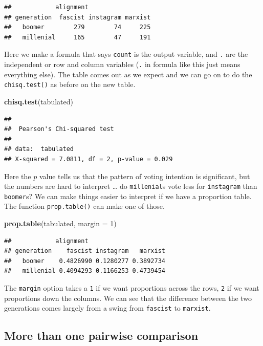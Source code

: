 \documentclass[
]{book}
\newenvironment{Shaded}{\begin{snugshade}}{\end{snugshade}}
\newcommand{\DataTypeTok}[1]{\textcolor[rgb]{0.13,0.29,0.53}{#1}}
\newcommand{\DecValTok}[1]{\textcolor[rgb]{0.00,0.00,0.81}{#1}}
\newcommand{\KeywordTok}[1]{\textcolor[rgb]{0.13,0.29,0.53}{\textbf{#1}}}
\newcommand{\NormalTok}[1]{#1}
\begin{document}
\begin{verbatim}
##            alignment
## generation  fascist instagram marxist
##   boomer        279        74     225
##   millenial     165        47     191
\end{verbatim}

Here we make a formula that says \texttt{count} is the output variable, and \texttt{.} are the independent or row and column variables (\texttt{.} in formula like this just means everything else). The table comes out as we expect and we can go on to do the \texttt{chisq.test()} as before on the new table.

\begin{Shaded}
\begin{Highlighting}[]
\KeywordTok{chisq.test}\NormalTok{(tabulated)}
\end{Highlighting}
\end{Shaded}

\begin{verbatim}
## 
## 	Pearson's Chi-squared test
## 
## data:  tabulated
## X-squared = 7.0811, df = 2, p-value = 0.029
\end{verbatim}

Here the \(p\) value tells us that the pattern of voting intention is significant, but the numbers are hard to interpret \ldots{} do \texttt{millenial}s vote less for \texttt{instagram} than \texttt{boomer}s? We can make things easier to interpret if we have a proportion table. The function \texttt{prop.table()} can make one of those.

\begin{Shaded}
\begin{Highlighting}[]
\KeywordTok{prop.table}\NormalTok{(tabulated, }\DataTypeTok{margin =} \DecValTok{1}\NormalTok{)}
\end{Highlighting}
\end{Shaded}

\begin{verbatim}
##            alignment
## generation    fascist instagram   marxist
##   boomer    0.4826990 0.1280277 0.3892734
##   millenial 0.4094293 0.1166253 0.4739454
\end{verbatim}

The \texttt{margin} option takes a \texttt{1} if we want proportions across the rows, \texttt{2} if we want proportions down the columns. We can see that the difference between the two generations comes largely from a swing from \texttt{fascist} to \texttt{marxist}.

\hypertarget{more-than-one-pairwise-comparison}{%
\subsection{More than one pairwise comparison}\label{more-than-one-pairwise-comparison}}
\end{document}
